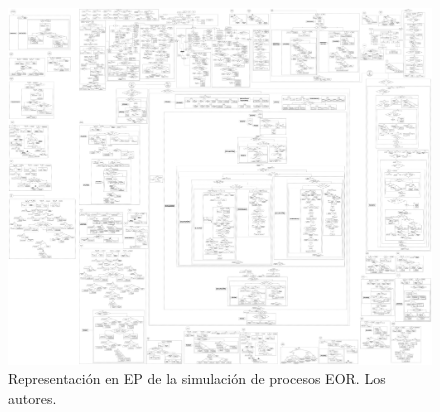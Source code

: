 \begin{figure}[h]
\centering%
\includegraphics[width=0.9\linewidth]{Fig/EPConQuimico.pdf}%
\caption[Representación en EP de la simulación de procesos EOR.]{Representación en EP de la simulación de procesos EOR. Los autores.} \label{fig:PSComplete}
\end{figure}


